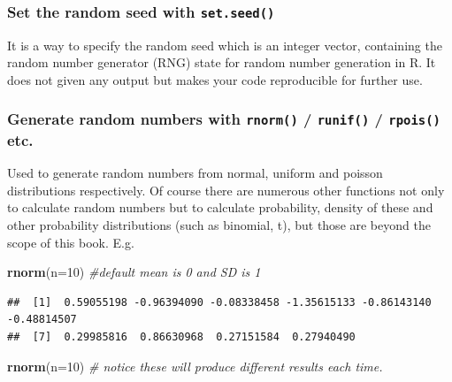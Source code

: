 \documentclass[
]{book}
\newenvironment{Shaded}{\begin{snugshade}}{\end{snugshade}}
\newcommand{\AttributeTok}[1]{\textcolor[rgb]{0.13,0.29,0.53}{#1}}
\newcommand{\CommentTok}[1]{\textcolor[rgb]{0.56,0.35,0.01}{\textit{#1}}}
\newcommand{\DecValTok}[1]{\textcolor[rgb]{0.00,0.00,0.81}{#1}}
\newcommand{\FunctionTok}[1]{\textcolor[rgb]{0.13,0.29,0.53}{\textbf{#1}}}
\newcommand{\NormalTok}[1]{#1}
\begin{document}
\hypertarget{set-the-random-seed-with-set.seed}{%
\subsubsection*{\texorpdfstring{Set the random seed with \texttt{set.seed()}}{Set the random seed with set.seed()}}\label{set-the-random-seed-with-set.seed}}

It is a way to specify the random seed which is an integer vector, containing the random number generator (RNG) state for random number generation in R. It does not given any output but makes your code reproducible for further use.

\hypertarget{generate-random-numbers-with-rnorm-runif-rpois-etc.}{%
\subsubsection*{\texorpdfstring{Generate random numbers with \texttt{rnorm()} / \texttt{runif()} / \texttt{rpois()} etc.}{Generate random numbers with rnorm() / runif() / rpois() etc.}}\label{generate-random-numbers-with-rnorm-runif-rpois-etc.}}

Used to generate random numbers from normal, uniform and poisson distributions respectively. Of course there are numerous other functions not only to calculate random numbers but to calculate probability, density of these and other probability distributions (such as binomial, t), but those are beyond the scope of this book. E.g.

\begin{Shaded}
\begin{Highlighting}[]
\FunctionTok{rnorm}\NormalTok{(}\AttributeTok{n=}\DecValTok{10}\NormalTok{) }\CommentTok{\#default mean is 0 and SD is 1}
\end{Highlighting}
\end{Shaded}

\begin{verbatim}
##  [1]  0.59055198 -0.96394090 -0.08338458 -1.35615133 -0.86143140 -0.48814507
##  [7]  0.29985816  0.86630968  0.27151584  0.27940490
\end{verbatim}

\begin{Shaded}
\begin{Highlighting}[]
\FunctionTok{rnorm}\NormalTok{(}\AttributeTok{n=}\DecValTok{10}\NormalTok{) }\CommentTok{\# notice these will produce different results each time.}
\end{Highlighting}
\end{Shaded}
\end{document}
